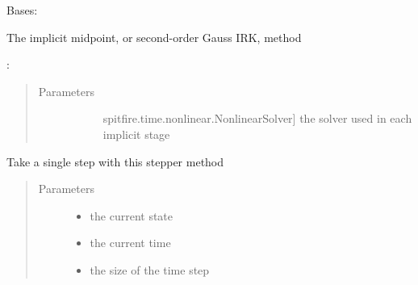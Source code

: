 \documentclass[letterpaper,10pt,english]{sphinxmanual}
\begin{document}
\begin{fulllineitems}
\label{\detokenize{spitfire.time.methods:spitfire.time.methods.ImplicitMidpoint}}
Bases: {\hyperref[\detokenize{spitfire.time.methods:spitfire.time.methods.ImplicitTimeStepper}]{}}

The implicit midpoint, or second-order Gauss IRK, method

:
\begin{quote}\begin{description}
\item[{Parameters}] \leavevmode\begin{description}
\item[{}] \leavevmode{[}spitfire.time.nonlinear.NonlinearSolver{]}
the solver used in each implicit stage

\end{description}

\end{description}\end{quote}

\begin{fulllineitems}
\label{\detokenize{spitfire.time.methods:spitfire.time.methods.ImplicitMidpoint.single_step}}
Take a single step with this stepper method
\begin{quote}\begin{description}
\item[{Parameters}] \leavevmode\begin{itemize}
\item {} 
 \textendash{} the current state

\item {} 
 \textendash{} the current time

\item {} 
 \textendash{} the size of the time step


\end{itemize}
\end{description}
\end{quote}
\end{fulllineitems}
\end{fulllineitems}
\end{document}
